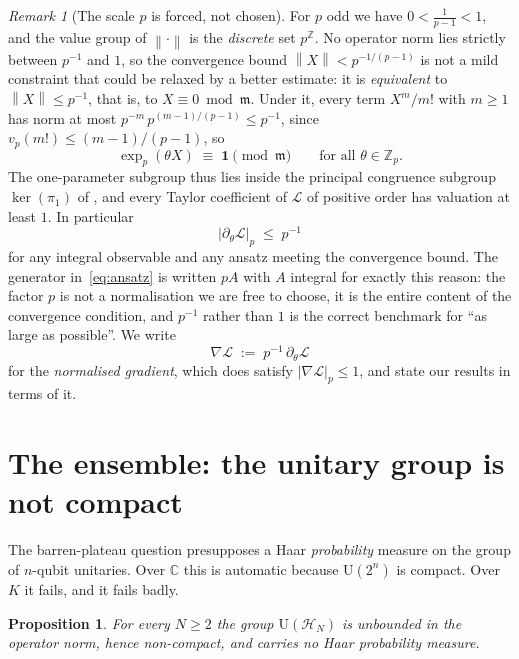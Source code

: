 \documentclass{ceurart}
\theoremstyle{plain}
\newtheorem{proposition}[theorem]{Proposition}
\theoremstyle{definition}
\theoremstyle{remark}
\newtheorem{remark}[theorem]{Remark}
\theoremstyle{plain}
\newcommand{\Zp}{\mathbb{Z}_p}
\newcommand{\padicnorm}[1]{\left|#1\right|_p}
\newcommand{\opnorm}[1]{\left\|#1\right\|}
\newcommand{\HH}{\mathcal{H}}
\newcommand{\mm}{\mathfrak{m}}
\newcommand{\Id}{\mathbf{1}}
\newcommand{\loss}{\mathcal{L}}
\newcommand{\Uni}{\mathrm{U}}
\begin{document}
\begin{remark}[The scale $p$ is forced, not chosen]
\label{rem:scale}
For $p$ odd we have $0<\tfrac1{p-1}<1$, and the value group of
$\opnorm{\cdot}$ is the \emph{discrete} set $p^{\mathbb{Z}}$. No operator norm
lies strictly between $p^{-1}$ and $1$, so the convergence bound
$\opnorm{X}<p^{-1/(p-1)}$ is not a mild constraint that could be relaxed by a
better estimate: it is \emph{equivalent} to $\opnorm X\le p^{-1}$, that is, to
$X\equiv0\bmod\mm$. Under it, every term $X^{m}/m!$ with $m\ge1$ has norm at
most $p^{-m}\,p^{(m-1)/(p-1)}\le p^{-1}$, since $v_p(m!)\le(m-1)/(p-1)$, so
\[
  \exp_p(\theta X)\;\equiv\;\Id \pmod{\mm}\qquad\text{for all }\theta\in\Zp .
\]
The one-parameter subgroup thus lies inside the principal congruence subgroup
$\ker(\pi_1)$ of , and every Taylor coefficient of $\loss$
of positive order has valuation at least $1$. In particular
\[
  \padicnorm{\partial_\theta\loss}\;\le\;p^{-1}
\]
for any integral observable and any ansatz meeting the convergence bound. The generator in~\eqref{eq:ansatz} is written $pA$ with $A$
integral for exactly this reason: the factor $p$ is not a normalisation we are
free to choose, it is the entire content of the convergence condition, and
$p^{-1}$ rather than $1$ is the correct benchmark for ``as large as possible''.
We write
\begin{equation}
\label{eq:normgrad}
  \nabla\loss\;:=\;p^{-1}\,\partial_\theta\loss
\end{equation}
for the \emph{normalised gradient}, which does satisfy
$\padicnorm{\nabla\loss}\le1$, and state our results in terms of it.
\end{remark}

\section{The ensemble: the unitary group is not compact}
\label{sec:noncompact}

The barren-plateau question presupposes a Haar \emph{probability} measure on
the group of $n$-qubit unitaries. Over $\mathbb{C}$ this is automatic because
$\mathrm{U}(2^n)$ is compact. Over $K$ it fails, and it fails badly.

\begin{proposition}
\label{prop:noncompact}
For every $N\ge 2$ the group $\Uni(\HH_N)$ is unbounded in the operator norm,
hence non-compact, and carries no Haar probability measure.
\end{proposition}
\end{document}
